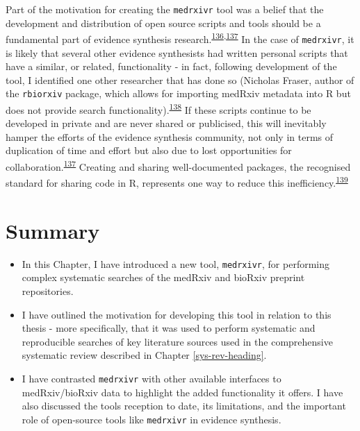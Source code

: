 \documentclass[a4paper, twoside]{templates/ociamthesis}
\begin{document}
Part of the motivation for creating the \texttt{medrxivr} tool was a belief that the development and distribution of open source scripts and tools should be a fundamental part of evidence synthesis research.\textsuperscript{\protect\hyperlink{ref-goldacre2019}{136},\protect\hyperlink{ref-mckiernan2016}{137}} In the case of \texttt{medrxivr}, it is likely that several other evidence synthesists had written personal scripts that have a similar, or related, functionality - in fact, following development of the tool, I identified one other researcher that has done so (Nicholas Fraser, author of the \texttt{rbiorxiv} package, which allows for importing medRxiv metadata into R but does not provide search functionality).\textsuperscript{\protect\hyperlink{ref-fraser2020rbiorixv}{138}} If these scripts continue to be developed in private and are never shared or publicised, this will inevitably hamper the efforts of the evidence synthesis community, not only in terms of duplication of time and effort but also due to lost opportunities for collaboration.\textsuperscript{\protect\hyperlink{ref-mckiernan2016}{137}} Creating and sharing well-documented packages, the recognised standard for sharing code in R, represents one way to reduce this inefficiency.\textsuperscript{\protect\hyperlink{ref-vuorre2020}{139}}

\hypertarget{summary-1}{%
\section{Summary}\label{summary-1}}

\begin{itemize}
\item
  In this Chapter, I have introduced a new tool, \texttt{medrxivr}, for performing complex systematic searches of the medRxiv and bioRxiv preprint repositories.
\item
  I have outlined the motivation for developing this tool in relation to this thesis - more specifically, that it was used to perform systematic and reproducible searches of key literature sources used in the comprehensive systematic review described in Chapter \ref{sys-rev-heading}.
\item
  I have contrasted \texttt{medrxivr} with other available interfaces to medRxiv/bioRxiv data to highlight the added functionality it offers. I have also discussed the tools reception to date, its limitations, and the important role of open-source tools like \texttt{medrxivr} in evidence synthesis.
\end{itemize}
\end{document}
